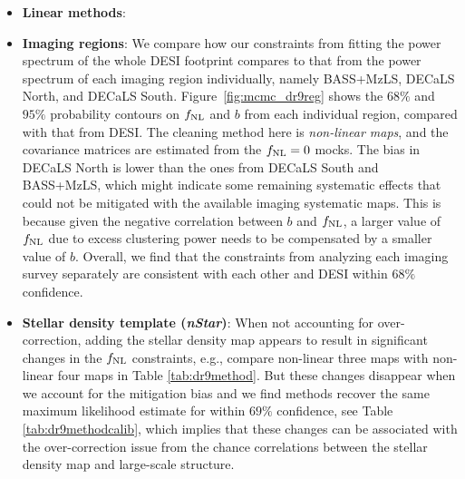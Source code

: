 \begin{itemize}[itemindent=*]

\item \textbf{Linear methods}: 
%
\item \textbf{Imaging regions}: We compare how our constraints from fitting the power spectrum of the whole DESI footprint compares to that from the power spectrum of each imaging region individually, namely BASS+MzLS, DECaLS North, and DECaLS South. Figure~\ref{fig:mcmc_dr9reg} shows the $68\%$ and $95\%$ probability contours on $f_{\rm NL}$ and $b$ from each individual region, compared with that from DESI. The cleaning method here is \textit{non-linear  maps}, and the covariance matrices are estimated from the $f_{\rm NL}=0$ mocks. The bias in DECaLS North is lower than the ones from DECaLS South and BASS+MzLS, which might indicate some remaining systematic effects that could not be mitigated with the available imaging systematic maps. This is because given the negative correlation between $b$ and $f_{\rm NL}$, a larger value of $f_{\rm NL}$ due to excess clustering power needs to be compensated by a smaller value of $b$. Overall, we find that the constraints from analyzing each imaging survey separately are consistent with each other and DESI within $68\%$ confidence. 

\item \textbf{Stellar density template (\textit{nStar})}: When not accounting for over-correction, adding the stellar density map appears to result in significant changes in the $f_{\rm NL}$ constraints, e.g., compare non-linear three maps with non-linear four maps in Table \ref{tab:dr9method}. But these changes disappear when we account for the mitigation bias and we find  methods recover the same maximum likelihood estimate for  within $69\%$ confidence, see Table \ref{tab:dr9methodcalib}, which implies that these changes can be associated with the over-correction issue from the chance correlations between the stellar density map and large-scale structure.


\end{itemize}
